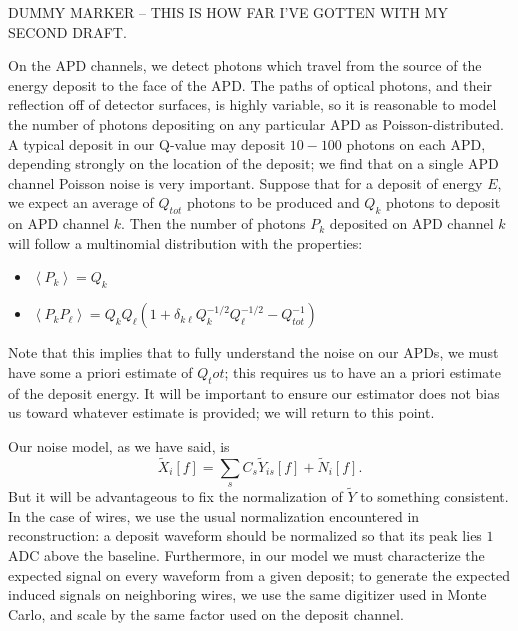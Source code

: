 DUMMY MARKER -- THIS IS HOW FAR I'VE GOTTEN WITH MY SECOND DRAFT.

On the APD channels, we detect photons which travel from the source of the energy deposit to the face of the APD.  The paths of optical photons, and their reflection off of detector surfaces, is highly variable, so it is reasonable to model the number of photons depositing on any particular APD as Poisson-distributed.  A typical deposit in our Q-value may deposit $10-100$ photons on each APD, depending strongly on the location of the deposit; we find that on a single APD channel Poisson noise is very important.  Suppose that for a deposit of energy $E$, we expect an average of $Q_{tot}$ photons to be produced and $Q_k$ photons to deposit on APD channel $k$.  Then the number of photons $P_k$ deposited on APD channel $k$ will follow a multinomial distribution with the properties:
\begin{itemize}
\item $\left< P_k \right> = Q_k$
\item $\left< P_k P_{\ell} \right> = Q_k Q_{\ell} \left( 1 + \delta_{k\ell}Q_k^{-1/2}Q_{\ell}^{-1/2} - Q_{tot}^{-1}\right)$
\end{itemize}

Note that this implies that to fully understand the noise on our APDs, we must have some a priori estimate of $Q_tot$; this requires us to have an a priori estimate of the deposit energy.  It will be important to ensure our estimator does not bias us toward whatever estimate is provided; we will return to this point.

Our noise model, as we have said, is \[\widetilde{X}_i[f] = \sum_s C_s\widetilde{Y}_{is}[f] + \widetilde{N}_i[f].\]  But it will be advantageous to fix the normalization of $\widetilde{Y}$ to something consistent.  In the case of wires, we use the usual normalization encountered in reconstruction: a deposit waveform should be normalized so that its peak lies $1$ ADC above the baseline.  Furthermore, in our model we must characterize the expected signal on every waveform from a given deposit; to generate the expected induced signals on neighboring wires, we use the same digitizer used in Monte Carlo, and scale by the same factor used on the deposit channel.


